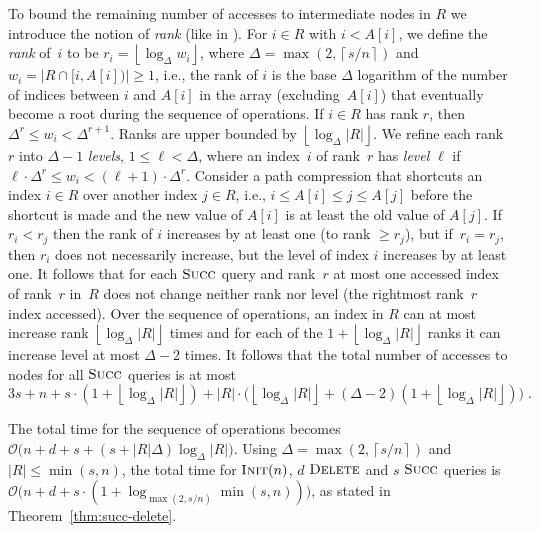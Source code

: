 \documentclass[a4paper]{lipics-v2021}
\newcommand{\Oh}{\mathcal{O}}
\newcommand{\floor}[1]{\left\lfloor{#1}\right\rfloor}
\newcommand{\ceil}[1]{\left\lceil #1\right\rceil}
\newcommand{\FuncName}[1]{\textup{\textsc{#1}}}
\newcommand{\Init}{\FuncName{Init}}
\newcommand{\Delete}{\FuncName{Delete}}
\newcommand{\Succ}{\FuncName{Succ}}
\begin{document}
To bound the remaining number of accesses to intermediate nodes in $R$ we introduce the notion of \emph{rank} (like in \cite{TarjanLeeuwen84}). For $i\in R$ with $i < A[i]$, we define the \emph{rank} of~$i$ to be $r_i = \floor{\log_\Delta w_i}$, where $\Delta = \max(2, \ceil{s/n})$ and $w_i = \bigl|R \cap [i,A[i])\bigr| \geq 1$, i.e., the rank of $i$ is the base $\Delta$ logarithm of the number of indices between $i$ and $A[i]$ in the array (excluding~$A[i]$) that eventually become a root during the sequence of operations. If $i \in R$ has rank $r$, then $\Delta^r \leq w_i < \Delta^{r+1}$. Ranks are upper bounded by $\floor{\log_\Delta |R|}$. We refine each rank~$r$ into $\Delta-1$ \emph{levels}, $1 \leq \ell < \Delta$, where an index~$i$ of rank~$r$ has \emph{level} $\ell$ if $\ell \cdot \Delta^r \leq w_i < (\ell+1)\cdot\Delta^r$. Consider a path compression that shortcuts an index $i\in R$ over another index $j\in R$, i.e., $i\leq A[i] \leq j \leq A[j]$ before the shortcut is made and the new value of $A[i]$ is at least the old value of $A[j]$. If $r_i < r_j$ then the rank of $i$ increases by at least one (to rank $\geq r_j$), but if~$r_i=r_j$, then $r_i$ does not necessarily increase, but the level of index $i$ increases by at least one. It follows that for each $\Succ$ query and rank~$r$ at most one accessed index of rank~$r$ in~$R$ does not change neither rank nor level (the rightmost rank~$r$ index accessed). Over the sequence of operations, an index in $R$ can at most increase rank $\floor{\log_\Delta |R|}$ times and for each of the $1+\floor{\log_\Delta |R|}$ ranks it can increase level at most $\Delta-2$ times. It follows that the total number of accesses to nodes for all $\Succ$ queries is at most
\[
3s + n + s \cdot (1+\floor{\log_\Delta |R|}) + |R|\cdot\bigl(\floor{\log_\Delta |R|} + (\Delta-2)(1+\floor{\log_\Delta |R|})\bigr) \;.
\]

The total time for the sequence of operations becomes $\Oh\bigl(n+d+s+(s+|R|\Delta)\log_\Delta |R|\bigr)$. Using $\Delta = \max(2, \ceil{s/n})$ and $|R|\leq \min(s,n)$, the total time for $\Init(n)$, $d$ $\Delete$ and $s$ $\Succ$ queries is $\Oh\bigl(n+d+s \cdot (1 + \log_{\max(2, s/n)} \min(s,n))\bigr)$, as stated in Theorem~\ref{thm:succ-delete}.
\end{document}

